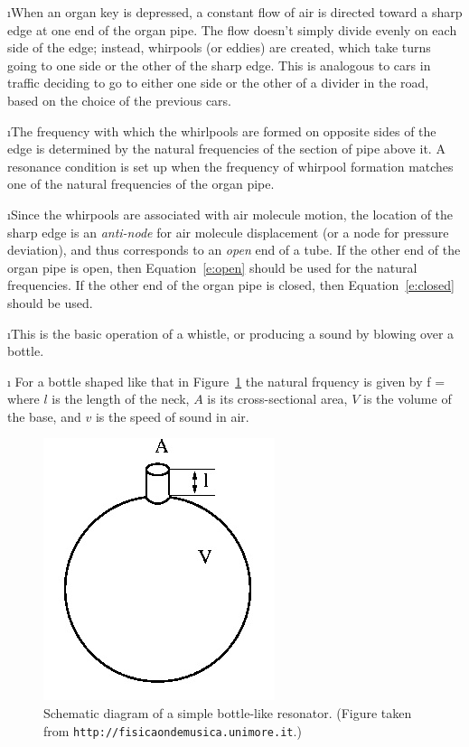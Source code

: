 \i When an organ key is depressed, a constant 
flow of air is directed toward a sharp edge
at one end of the organ pipe.
The flow doesn't simply divide evenly on each
side of the edge; 
instead, whirpools (or eddies) are created, 
which take turns going to one
side or the other of the sharp edge.
This is analogous to cars in traffic deciding
to go to either one side or the other of 
a divider in the road, based on the choice of
the previous cars.

\i The frequency with which the whirlpools
are formed on opposite sides of the edge
is determined by the natural frequencies of the
section of pipe above it.
A resonance condition is set up when the 
frequency of whirpool formation matches one
of the natural frequencies of the organ pipe.

\i Since the whirpools are associated with
air molecule motion, the location of the 
sharp edge is an {\em anti-node} for air molecule 
displacement (or a node for pressure deviation), 
and thus corresponds to an {\em open} end of a tube.
If the other end of the organ pipe is open, 
then Equation~\ref{e:open} 
should be used for the natural frequencies.
If the other end of the organ pipe is closed, 
then Equation~\ref{e:closed} should be used.

\i This is the basic operation of a 
whistle, or producing a sound by blowing
over a bottle.

\i \ex
For a bottle shaped like that in 
Figure~\ref{f:helmholtzresonator}
the natural frquency is given by
%
\be
f = 
\ee
%
where $l$ is the length of the neck, $A$ is its
cross-sectional area, $V$ is the volume of 
the base, and $v$ is the speed of sound in air.
%
\begin{figure}[htbp]
\begin{center}
\includegraphics[width=.4\textwidth]{helmholtzresonator.jpg}
\caption{Schematic diagram of a simple
bottle-like resonator.
(Figure taken from {\tt http://fisicaondemusica.unimore.it}.)}
\label{f:helmholtzresonator}
\end{center}
\end{figure}

